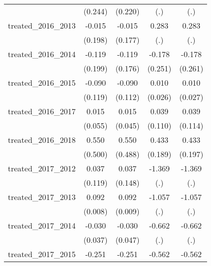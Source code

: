 {\begin{tabular}{l*{4}{c}}
            &     (0.244)         &     (0.220)         &         (.)         &         (.)         \\
[1em]
treated\_2016\_2013&      -0.015         &      -0.015         &       0.283         &       0.283         \\
            &     (0.198)         &     (0.177)         &         (.)         &         (.)         \\
[1em]
treated\_2016\_2014&      -0.119         &      -0.119         &      -0.178         &      -0.178         \\
            &     (0.199)         &     (0.176)         &     (0.251)         &     (0.261)         \\
[1em]
treated\_2016\_2015&      -0.090         &      -0.090         &       0.010         &       0.010         \\
            &     (0.119)         &     (0.112)         &     (0.026)         &     (0.027)         \\
[1em]
treated\_2016\_2017&       0.015         &       0.015         &       0.039         &       0.039         \\
            &     (0.055)         &     (0.045)         &     (0.110)         &     (0.114)         \\
[1em]
treated\_2016\_2018&       0.550         &       0.550         &       0.433\sym{*}  &       0.433\sym{*}  \\
            &     (0.500)         &     (0.488)         &     (0.189)         &     (0.197)         \\
[1em]
treated\_2017\_2012&       0.037         &       0.037         &      -1.369         &      -1.369         \\
            &     (0.119)         &     (0.148)         &         (.)         &         (.)         \\
[1em]
treated\_2017\_2013&       0.092\sym{***}&       0.092\sym{***}&      -1.057         &      -1.057         \\
            &     (0.008)         &     (0.009)         &         (.)         &         (.)         \\
[1em]
treated\_2017\_2014&      -0.030         &      -0.030         &      -0.662         &      -0.662         \\
            &     (0.037)         &     (0.047)         &         (.)         &         (.)         \\
[1em]
treated\_2017\_2015&      -0.251\sym{**} &      -0.251\sym{**} &      -0.562         &      -0.562         \\

\end{tabular}}
